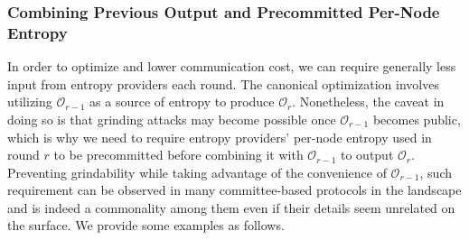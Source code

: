 \documentclass[conference]{IEEEtran}
\theoremstyle{definition}
\theoremstyle{remark}
\begin{document}
\subsubsection{Combining Previous Output and Precommitted Per-Node Entropy}
\label{subsubsection:precommitted}
In order to optimize and lower communication cost, we can require generally less input from entropy providers each round. The canonical optimization involves utilizing $\mathcal{O}_{r - 1}$ as a source of entropy to produce $\mathcal{O}_{r}$. Nonetheless, the caveat in doing so is that grinding attacks may become possible once $\mathcal{O}_{r - 1}$ becomes public, which is why we need to require entropy providers' per-node entropy used in round $r$ to be precommitted before combining it with $\mathcal{O}_{r - 1}$ to output $\mathcal{O}_r$. Preventing grindability while taking advantage of the convenience of $\mathcal{O}_{r - 1}$, such requirement can be observed in many committee-based protocols in the landscape and is indeed a commonality among them even if their details seem unrelated on the surface. We provide some examples as follows.
\end{document}
